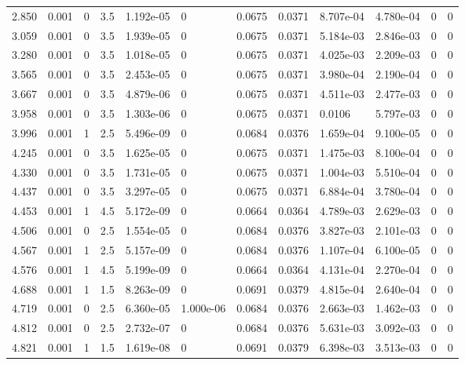 \documentclass[preview]{standalone}
\begin{document}
{{\begin{tabular}{L{1.2cm}C{1.2cm} C{0.3cm}C{0.5cm} C{1.4cm}C{1.4cm} C{1.4cm}C{1.4cm} C{1.6cm}C{1.6cm} C{1.6cm}C{1.6cm}}
  2.850  &  0.001  & 0     & 3.5 &  1.192e-05  & 0  &  0.0675&   0.0371& 8.707e-04 & 4.780e-04   &  0 & 0  \\ 
  3.059  &  0.001  & 0     & 3.5 &  1.939e-05  & 0  &  0.0675&   0.0371& 5.184e-03 & 2.846e-03   &  0 & 0  \\ 
  3.280  &  0.001  & 0     & 3.5 &  1.018e-05  & 0  &  0.0675&   0.0371& 4.025e-03 & 2.209e-03   &  0 & 0  \\ 
  3.565  &  0.001  & 0     & 3.5 &  2.453e-05  & 0  &  0.0675&   0.0371& 3.980e-04 & 2.190e-04   &  0 & 0  \\ 
  3.667  &  0.001  & 0     & 3.5 &  4.879e-06  & 0  &  0.0675&   0.0371& 4.511e-03 & 2.477e-03   &  0 & 0  \\ 
  3.958  &  0.001  & 0     & 3.5 &  1.303e-06  & 0  &  0.0675&   0.0371& 0.0106 & 5.797e-03   &  0 & 0  \\ 
  3.996  &  0.001  & 1     & 2.5 &  5.496e-09  & 0  &  0.0684&   0.0376& 1.659e-04 & 9.100e-05   &  0 & 0  \\ 
  4.245  &  0.001  & 0     & 3.5 &  1.625e-05  & 0  &  0.0675&   0.0371& 1.475e-03 & 8.100e-04   &  0 & 0  \\ 
  4.330  &  0.001  & 0     & 3.5 &  1.731e-05  & 0  &  0.0675&   0.0371& 1.004e-03 & 5.510e-04   &  0 & 0  \\ 
  4.437  &  0.001  & 0     & 3.5 &  3.297e-05  & 0  &  0.0675&   0.0371& 6.884e-04 & 3.780e-04   &  0 & 0  \\ 
  4.453  &  0.001  & 1     & 4.5 &  5.172e-09  & 0  &  0.0664&   0.0364& 4.789e-03 & 2.629e-03   &  0 & 0  \\ 
  4.506  &  0.001  & 0     & 2.5 &  1.554e-05  & 0  &  0.0684&   0.0376& 3.827e-03 & 2.101e-03   &  0 & 0  \\ 
  4.567  &  0.001  & 1     & 2.5 &  5.157e-09  & 0  &  0.0684&   0.0376& 1.107e-04 & 6.100e-05   &  0 & 0  \\ 
  4.576  &  0.001  & 1     & 4.5 &  5.199e-09  & 0  &  0.0664&   0.0364& 4.131e-04 & 2.270e-04   &  0 & 0  \\ 
  4.688  &  0.001  & 1     & 1.5 &  8.263e-09  & 0  &  0.0691&   0.0379& 4.815e-04 & 2.640e-04   &  0 & 0  \\ 
  4.719  &  0.001  & 0     & 2.5 &  6.360e-05  & 1.000e-06  &  0.0684&   0.0376& 2.663e-03 & 1.462e-03   &  0 & 0  \\ 
  4.812  &  0.001  & 0     & 2.5 &  2.732e-07  & 0  &  0.0684&   0.0376& 5.631e-03 & 3.092e-03   &  0 & 0  \\ 
  4.821  &  0.001  & 1     & 1.5 &  1.619e-08  & 0  &  0.0691&   0.0379& 6.398e-03 & 3.513e-03   &  0 & 0  \\ 

\end{tabular}}}
\end{document}
